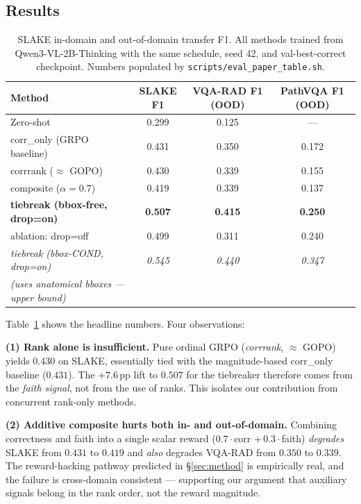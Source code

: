 \documentclass[11pt]{article}
\begin{document}
\subsection{Results}

\begin{table}[t]
\centering
\small
\begin{tabular}{lccc}
\toprule
\textbf{Method} & \textbf{SLAKE F1} & \textbf{VQA-RAD F1} (OOD) & \textbf{PathVQA F1} (OOD)\\
\midrule
Zero-shot                          & 0.299        & 0.125        & ---         \\
\midrule
corr\_only (GRPO baseline)         & 0.431        & 0.350        & 0.172       \\
corrrank ($\approx$ GOPO)          & 0.430        & 0.339        & 0.155       \\
composite ($\alpha{=}0.7$)         & 0.419        & 0.339        & 0.137       \\
\midrule
\textbf{tiebreak (bbox-free, drop=on)}  & \textbf{0.507}  & \textbf{0.415}   & \textbf{0.250} \\
\quad ablation: drop=off            & 0.499         & 0.311         & 0.240        \\
\midrule
\textit{tiebreak (bbox-COND, drop=on)} & \textit{0.545} & \textit{0.440} & \textit{0.347} \\
\quad \emph{(uses anatomical bboxes --- upper bound)} & & & \\
\bottomrule
\end{tabular}
\caption{SLAKE in-domain and out-of-domain transfer F1. All methods
trained from Qwen3-VL-2B-Thinking with the same schedule, seed 42, and
val-best-correct checkpoint. Numbers populated by
\texttt{scripts/eval\_paper\_table.sh}.}
\label{tab:main}
\end{table}

Table~\ref{tab:main} shows the headline numbers. Four observations:

\textbf{(1) Rank alone is insufficient.} Pure ordinal GRPO
(\emph{corrrank}, $\approx$ GOPO) yields $0.430$ on SLAKE, essentially
tied with the magnitude-based corr\_only baseline ($0.431$). The
$+7.6$\,pp lift to $0.507$ for the tiebreaker therefore comes from the
\emph{faith signal}, not from the use of ranks. This isolates our
contribution from concurrent rank-only methods.

\textbf{(2) Additive composite hurts both in- and out-of-domain.}
Combining correctness and faith into a single scalar reward ($0.7\cdot$corr
$+\,0.3\cdot$faith) \emph{degrades} SLAKE from $0.431$ to $0.419$ and
\emph{also} degrades VQA-RAD from $0.350$ to $0.339$. The reward-hacking
pathway predicted in \S\ref{sec:method} is empirically real, and the
failure is cross-domain consistent --- supporting our argument that
auxiliary signals belong in the rank order, not the reward magnitude.
\end{document}
